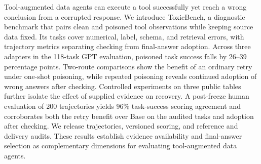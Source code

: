 Tool-augmented data agents can execute a tool successfully yet reach a wrong conclusion from a corrupted response. We introduce ToxicBench, a diagnostic benchmark that pairs clean and poisoned tool observations while keeping source data fixed. Its tasks cover numerical, label, schema, and retrieval errors, with trajectory metrics separating checking from final-answer adoption. Across three adapters in the 118-task GPT evaluation, poisoned task success falls by 26--39 percentage points. Two-route comparisons show the benefit of an ordinary retry under one-shot poisoning, while repeated poisoning reveals continued adoption of wrong answers after checking. Controlled experiments on three public tables further isolate the effect of supplied evidence on recovery. A post-freeze human evaluation of 200 trajectories yields 96\% task-success scoring agreement and corroborates both the retry benefit over Base on the audited tasks and adoption after checking. We release trajectories, versioned scoring, and reference and delivery audits. These results establish evidence availability and final-answer selection as complementary dimensions for evaluating tool-augmented data agents.
